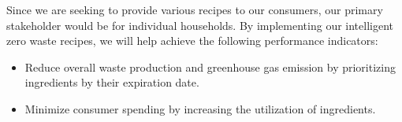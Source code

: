 \documentclass{article}
\begin{document}
Since we are seeking to provide various recipes to our consumers,  our primary stakeholder would be for individual households. 
By implementing our intelligent zero waste recipes, we will help achieve the following performance indicators:
\begin{itemize}
\item Reduce overall waste production and greenhouse gas emission by prioritizing ingredients by their expiration date.
\item Minimize consumer spending by increasing the utilization of ingredients.  
\end{itemize}	

			
\end{document}

